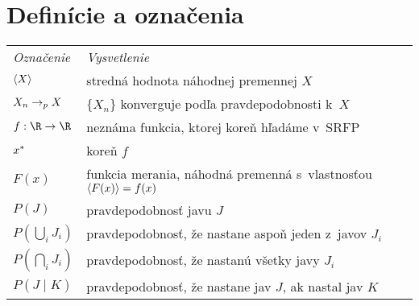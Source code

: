 \section*{Definície a označenia}
\begin{tabular}{ll}
\textsl{Označenie}&\textsl{Vysvetlenie}\vspace{0.3em}\\
$\langle X \rangle$& stredná hodnota náhodnej premennej $X$\\
$X_n\rightarrow_p X$& $\{X_n\}$ konverguje podľa pravdepodobnosti k~$X$\\
$f: \R\to\R$& neznáma funkcia, ktorej koreň hľadáme v~SRFP\\
$x^\ast$& koreň $f$\\
$F(x)$& funkcia merania, náhodná premenná s~vlastnosťou $\langle F(x) \rangle = f(x)$\\
$P(J)$& pravdepodobnosť javu $J$\\
$P(\bigcup_i J_i)$& pravdepodobnosť, že nastane aspoň jeden z~javov $J_i$\\
$P(\bigcap_i J_i)$& pravdepodobnosť, že nastanú všetky javy $J_i$\\
$P(J \mid K)$& pravdepodobnosť, že nastane jav $J$, ak nastal jav $K$\\
\end{tabular}
